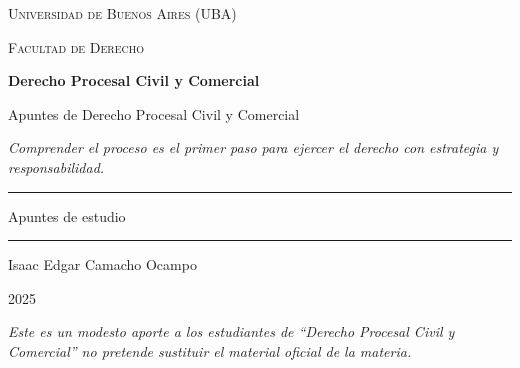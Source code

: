 \documentclass[12pt,oneside]{book}
\newcommand{\universidad}{Universidad de Buenos Aires (UBA)}
\newcommand{\facultad}{Facultad de Derecho}
\newcommand{\materia}{Derecho Procesal Civil y Comercial}
\newcommand{\titulo}{Apuntes de Derecho Procesal Civil y Comercial}
\newcommand{\autor}{Isaac Edgar Camacho Ocampo}
\newcommand{\anio}{2025}
\begin{document}
\begin{titlepage}
\thispagestyle{empty}

\begin{center}

\vspace*{1cm}

{\large \textsc{\universidad}}

\vspace{0.2cm}

{\large \textsc{\facultad}}

\vspace{3cm}

{\Huge \textbf{\materia}}

\vspace{1cm}

{\LARGE \titulo}

\vspace{0.8cm}

\textit{Comprender el proceso es el primer paso para ejercer el derecho con estrategia y responsabilidad.}

\vspace{1.2cm}

\rule{0.70\textwidth}{0.5pt}

\vspace{0.5cm}

{\large Apuntes de estudio}

\vspace{0.5cm}

\rule{0.70\textwidth}{0.5pt}

\vfill

{\large \autor}

\vspace{0.3cm}

{\large \anio}

\end{center}

\vfill

\begin{flushleft}
\textit{Este es un modesto aporte a los estudiantes de ``Derecho Procesal Civil y Comercial'' no pretende sustituir el material oficial de la materia.}
\end{flushleft}

\end{titlepage}

\tableofcontents
\clearpage
\end{document}
